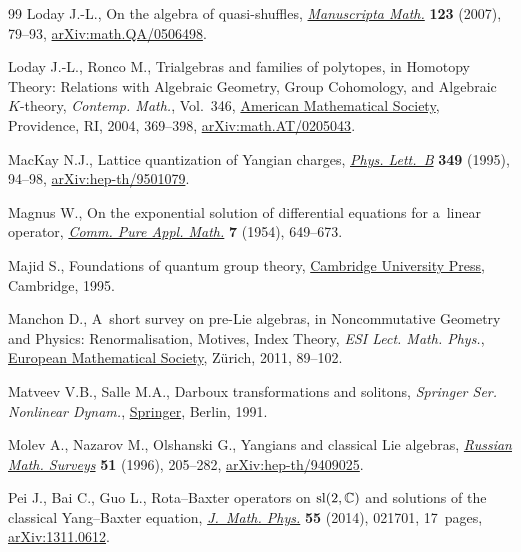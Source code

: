\documentclass[10pt,a4paper]{amsart}
\numberwithin{equation}{section}
\newcounter{diff_order}
\newcounter{diff_power}
\theoremstyle{definition}
\begin{document}
\begin{thebibliography}{99}
Loday J.-L., On the algebra of quasi-shuffles,
 \href{https://doi.org/10.1007/s00229-007-0086-2}{\textit{Manuscripta Math.}}
 \textbf{123} (2007), 79--93,
 \href{http://arxiv.org/abs/math.QA/0506498}{arXiv:math.QA/0506498}.

Loday J.-L., Ronco M., Trialgebras and families of polytopes, in Homotopy
 Theory: Relations with Algebraic Geo\-metry, Group Cohomology, and Algebraic
 {$K$}-theory, \textit{Contemp. Math.}, Vol.~346,
 \href{https://doi.org/10.1090/conm/346/06296}{American Mathematical Society},
 Providence, RI, 2004, 369--398,
 \href{http://arxiv.org/abs/math.AT/0205043}{arXiv:math.AT/0205043}.

MacKay N.J., Lattice quantization of {Y}angian charges,
 \href{https://doi.org/10.1016/0370-2693(95)00222-7}{\textit{Phys. Lett.~B}}
 \textbf{349} (1995), 94--98,
 \href{http://arxiv.org/abs/hep-th/9501079}{arXiv:hep-th/9501079}.

Magnus W., On the exponential solution of differential equations for a~linear
 operator, \href{https://doi.org/10.1002/cpa.3160070404}{\textit{Comm. Pure
 Appl. Math.}} \textbf{7} (1954), 649--673.

Majid S., Foundations of quantum group theory,
 \href{https://doi.org/10.1017/CBO9780511613104}{Cambridge University Press},
 Cambridge, 1995.

Manchon D., A~short survey on pre-{L}ie algebras, in Noncommutative Geometry
 and Physics: Renormalisation, Motives, Index Theory, \textit{ESI Lect. Math. Phys.},
 \href{https://doi.org/10.4171/008-1/3}{European Mathematical Society},
 Z\"urich, 2011, 89--102.

Matveev V.B., Salle M.A., Darboux transformations and solitons, \textit{Springer Ser. Nonlinear Dynam.}, \href{https://doi.org/10.1007/978-3-662-00922-2}{Springer},
 Berlin, 1991.

Molev A., Nazarov M., Olshanski G., Yangians and classical {L}ie algebras,
 \href{https://doi.org/10.1070/RM1996v051n02ABEH002772}{\textit{Russian Math.
 Surveys}} \textbf{51} (1996), 205--282,
 \href{http://arxiv.org/abs/hep-th/9409025}{arXiv:hep-th/9409025}.

Pei J., Bai C., Guo L., Rota--{B}axter operators on {${\rm sl}(2,{\mathbb C})$}
 and solutions of the classical {Y}ang--{B}axter equation,
 \href{https://doi.org/10.1063/1.4863898}{\textit{J.~Math. Phys.}} \textbf{55}
 (2014), 021701, 17~pages,
 \href{http://arxiv.org/abs/1311.0612}{arXiv:1311.0612}.


\end{thebibliography}
\end{document}
